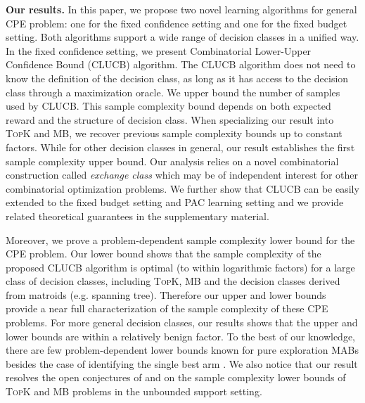 \documentclass{article}
\newcommand{\Algorithm}{{\small \textsf{CLUCB}}\xspace}
\newcommand{\Problem}{{CPE}\xspace}
\newcommand{\MultiIdent}{\textsc{TopK}\xspace}
\newcommand{\MultiBandit}{\textsc{MB}\xspace}
\begin{document}
\textbf{Our results.}
In this paper, we propose two novel learning algorithms for general \Problem problem: one for the fixed confidence setting and one for the fixed budget setting.
Both algorithms support a wide range of decision classes in a unified way. 
In the fixed confidence setting, we present Combinatorial Lower-Upper Confidence Bound (\Algorithm) algorithm.
The \Algorithm algorithm does not need to know the definition of the decision class, as long as it has access to the decision class through a maximization oracle.
We upper bound the number of samples used by \Algorithm. 
This sample complexity bound depends on both expected reward and the structure of decision class. 
When specializing our result into \MultiIdent and \MultiBandit, we recover previous sample complexity bounds \citep{kalyanakrishnan2012pac,gabillon2012best} up to constant factors.
While for other decision classes in general, our result establishes the first sample complexity upper bound. 
Our analysis relies on a novel combinatorial construction called \emph{exchange class} which may be of independent interest for other combinatorial optimization problems. 
We further show that \Algorithm can be easily extended to the fixed budget setting and PAC learning setting and we provide related theoretical guarantees in the supplementary material.  

Moreover, we prove a problem-dependent sample complexity lower bound for the \Problem problem.  
Our lower bound shows that the sample complexity of the proposed \Algorithm algorithm is optimal (to within logarithmic factors) for a large class of decision classes, including \MultiIdent, \MultiBandit and the decision classes derived from matroids (e.g. spanning tree). 
Therefore our upper and lower bounds  provide a near full characterization of the sample complexity of these \Problem problems. 
For more general decision classes, our results shows that the upper and lower bounds are within a relatively benign factor. 
To the best of our knowledge, there are few problem-dependent lower bounds known for pure exploration MABs besides the case of identifying the single best arm \citep{mannor2004sample,audibert2010best}.
We also notice that our result resolves the open conjectures of \citet{kalyanakrishnan2012pac} and \citet{bubeck2013multiple} on the sample complexity lower bounds of \MultiIdent and \MultiBandit problems in the unbounded support setting.
\end{document}
